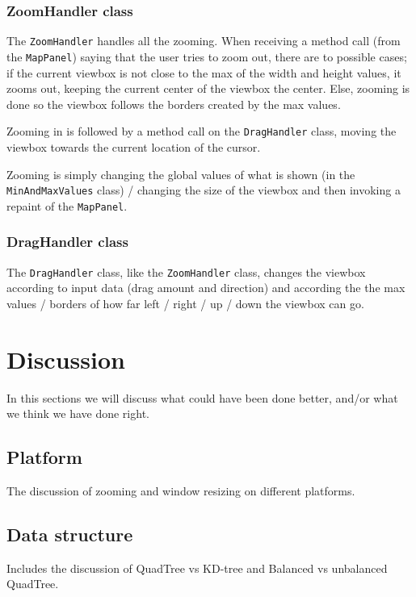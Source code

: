 \documentclass[a4paper,11pt]{article}
\begin{document}
\subsubsection{ZoomHandler class} %
The \texttt{ZoomHandler} handles all the zooming. When receiving a method call (from the \texttt{MapPanel}) saying that the user tries to zoom out, there are to possible cases; if the current viewbox is not close to the max of the width and height values, it zooms out, keeping the current center of the viewbox the center. Else, zooming is done so  the viewbox follows the borders created by the max values.

Zooming in is followed by a method call on the \texttt{DragHandler} class, moving the viewbox towards the current location of the cursor.

Zooming is simply changing the global values of what is shown (in the \texttt{MinAndMaxValues} class) / changing the size of the viewbox and then invoking a repaint of the \texttt{MapPanel}.

\subsubsection{DragHandler class} %
The \texttt{DragHandler} class, like the \texttt{ZoomHandler} class, changes the viewbox according to input data (drag amount and direction) and according the the max values / borders of how far left / right / up / down the viewbox can go.

\pagebreak
\section{Discussion} %
\label{sec:Discussion}
In this sections we will discuss what could have been done better, and/or what we think we have done right.

\subsection{Platform} %
The discussion of zooming and window resizing on different platforms.

\subsection{Data structure} %
Includes the discussion of QuadTree vs KD-tree and Balanced vs unbalanced QuadTree.
\end{document}
